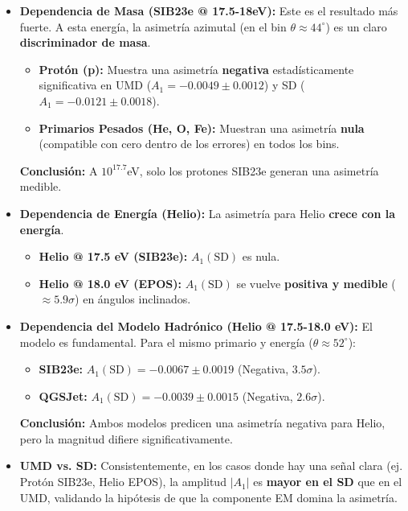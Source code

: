 \begin{itemize}
	\item \textbf{Dependencia de Masa (SIB23e @ 17.5-18eV):}
	Este es el resultado más fuerte. A esta energía, la asimetría azimutal (en el bin $\theta \approx 44^\circ$) es un claro \textbf{discriminador de masa}.
	\begin{itemize}
		\item \textbf{Protón (p):} Muestra una asimetría \textbf{negativa} estadísticamente significativa en UMD ($A_1 = -0.0049 \pm 0.0012$) y SD ($A_1 = -0.0121 \pm 0.0018$).
		\item \textbf{Primarios Pesados (He, O, Fe):} Muestran una asimetría \textbf{nula} (compatible con cero dentro de los errores) en todos los bins.
	\end{itemize}
	\textbf{Conclusión:} A $10^{17.7}$eV, solo los protones SIB23e generan una asimetría medible.
	
	\item \textbf{Dependencia de Energía (Helio):}
	La asimetría para Helio \textbf{crece con la energía}.
	\begin{itemize}
		\item \textbf{Helio @ 17.5 eV (SIB23e):} $A_1(\text{SD})$ es nula.
		\item \textbf{Helio @ 18.0 eV (EPOS):} $A_1(\text{SD})$ se vuelve \textbf{positiva y medible} ($\approx 5.9\sigma$) en ángulos inclinados.
	\end{itemize}
	
	\item \textbf{Dependencia del Modelo Hadrónico (Helio @ 17.5-18.0 eV):}
	El modelo es fundamental. Para el mismo primario y energía ($\theta \approx 52^\circ$):
	\begin{itemize}
		\item \textbf{SIB23e:} $A_1(\text{SD}) = -0.0067 \pm 0.0019$ (Negativa, $3.5\sigma$).
		\item \textbf{QGSJet:} $A_1(\text{SD}) = -0.0039 \pm 0.0015$ (Negativa, $2.6\sigma$).
	\end{itemize}
	\textbf{Conclusión:} Ambos modelos predicen una asimetría negativa para Helio, pero la magnitud difiere significativamente.
	
	\item \textbf{UMD vs. SD:} Consistentemente, en los casos donde hay una señal clara (ej. Protón SIB23e, Helio EPOS), la amplitud $|A_1|$ es \textbf{mayor en el SD} que en el UMD, validando la hipótesis de que la componente EM domina la asimetría.
\end{itemize}

